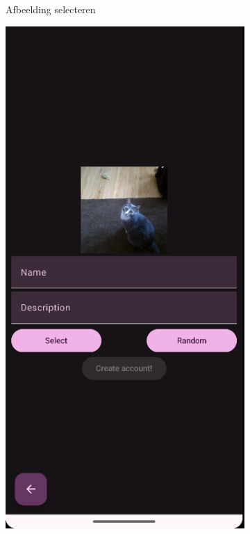 \documentclass{report}
\begin{document}
\begin{figure}[h]
\begin{subfigure}[b]{0.32\textwidth}
        \caption{Afbeelding selecteren}
    \end{subfigure}
    \hfill
    \begin{subfigure}[b]{0.32\textwidth}
        \includegraphics[width=\textwidth]{DEMO_RegRandom.png} 

\end{subfigure}
\end{figure}
\end{document}
